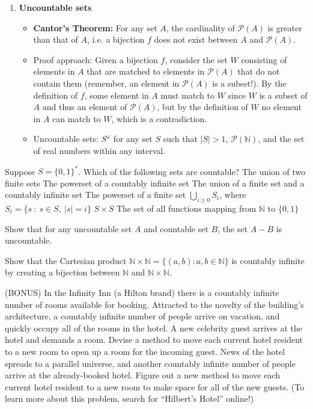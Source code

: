 \documentclass[solution, letterpaper]{cs20inclass}
\begin{document}
\begin{enumerate}
\item \textbf{Uncountable sets}
\begin{itemize}
\item {\bf Cantor's Theorem:} For any set $A$, the cardinality of $\mathcal{P}(A)$ is greater than that of $A$, i.e. a bijection $f$ does not exist between $A$ and $\mathcal{P}(A)$.
\item Proof approach: Given a bijection $f$, consider the set $W$ consisting of elements in $A$ that are matched to elements in $\mathcal{P}(A)$ that do not contain them (remember, an element in $\mathcal{P}(A)$ is a subset!). By the definition of $f$, some element in $A$ must match to $W$ since $W$ is a subset of $A$ and thus an element of $\mathcal{P}(A)$, but by the definition of $W$ no element in $A$ can match to $W$, which is a contradiction.
\item Uncountable sets: $S^\omega$ for any set $S$ such that $|S|>1$, $\mathcal{P}(\mathbb{N})$, and the set of real numbers within any interval.
\end{itemize}

\end{enumerate}
\pagebreak

\problem Suppose $S=\{0,1\}^*$. Which of the following sets are countable?
\subproblem The union of two finite sets
\subproblem The powerset of a countably infinite set
\subproblem The union of a finite set and a countably infinite set
\subproblem The powerset of a finite set
\subproblem $\bigcup_{i\geq 0} S_i$, where $S_i=\{s\ : \ s \in S, \ |s|=i\}$
\subproblem $S \times S$
\subproblem The set of all functions mapping from $\mathbb{N}$ to $\{0, 1\}$

\problem Show that for any uncountable set $A$ and countable set $B$, the set $A-B$ is uncountable.

\problem Show that the Cartesian product $\mathbb{N} \times \mathbb{N} = \{(a,b):a,b \in \mathbb{N}\}$ is countably infinite by creating a bijection between $\mathbb{N}$ and $\mathbb{N} \times \mathbb{N}$.

\problem (BONUS) In the Infinity Inn (a Hilton brand) there is a countably infinite number of rooms available for booking. Attracted to the novelty of the building's architecture, a countably infinite number of people arrive on vacation, and quickly occupy all of the rooms in the hotel.
\subproblem A new celebrity guest arrives at the hotel and demands a room. Devise a method to move each current hotel resident to a new room to open up a room for the incoming guest.
\subproblem News of the hotel spreads to a parallel universe, and another countably infinite number of people arrive at the already-booked hotel. Figure out a new method to move each current hotel resident to a new room to make space for all of the new guests. (To learn more about this problem, search for ``Hilbert's Hotel'' online!)
\end{document}
